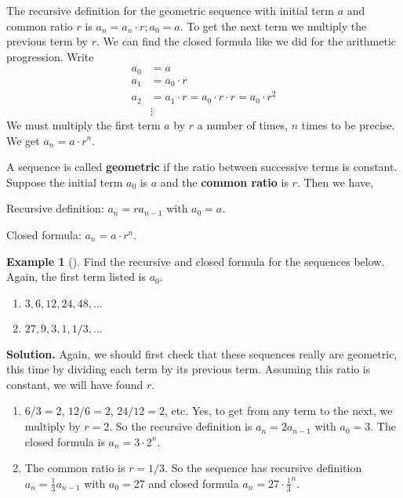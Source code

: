 \documentclass[12pt,]{book}
\newcommand{\terminology}[1]{\textbf{#1}}
\theoremstyle{plain}
\theoremstyle{definition}
\theoremstyle{definition}
\newtheorem{example}[theorem]{Example}
\theoremstyle{definition}
\numberwithin{equation}{chapter}
\newcommand{\amp}{&}
\begin{document}
\par
\hypertarget{p-114}{}%
The recursive definition for the geometric sequence with initial term \(a\) and common ratio \(r\) is \(a_n = a_{n}\cdot r; a_0 = a\). To get the next term we multiply the previous term by \(r\). We can find the closed formula like we did for the arithmetic progression. Write%
\begin{align*}
a_0 \amp = a\\
a_1 \amp = a_0\cdot r\\
a_2 \amp = a_1 \cdot r = a_0\cdot r\cdot r = a_0\cdot r^2\\
\amp \vdots 
\end{align*}
We must multiply the first term \(a\) by \(r\) a number of times, \(n\) times to be precise. We get \(a_n = a\cdot r^{n}\).%
\begin{assemblage}\label{assemblage-4}
\hypertarget{p-115}{}%
A sequence is called \terminology{geometric} if the ratio between successive terms is constant. Suppose the initial term \(a_0\) is \(a\) and the \terminology{common ratio} is \(r\). Then we have,%
\par
\hypertarget{p-116}{}%
Recursive definition: \(a_n = ra_{n-1}\) with \(a_0 = a\).%
\par
\hypertarget{p-117}{}%
Closed formula: \(a_n = a\cdot r^{n}\).%
\end{assemblage}
\begin{example}[]\label{example-6}
\hypertarget{p-118}{}%
Find the recursive and closed formula for the sequences below. Again, the first term listed is \(a_0\). \leavevmode%
\begin{enumerate}
\item\hypertarget{li-78}{}\(3, 6, 12, 24, 48, \ldots\)%
\item\hypertarget{li-79}{}\(27, 9, 3, 1, 1/3, \ldots\)%
\end{enumerate}
%
\par\smallskip%
\noindent\textbf{Solution.}\hypertarget{solution-8}{}\quad%
\hypertarget{p-119}{}%
Again, we should first check that these sequences really are geometric, this time by dividing each term by its previous term.  Assuming this ratio is constant, we will have found \(r\). \leavevmode%
\begin{enumerate}
\item\hypertarget{li-80}{}\(6/3 = 2\), \(12/6 = 2\), \(24/12 = 2\), etc. Yes, to get from any term to the next, we multiply by \(r = 2\). So the recursive definition is \(a_n = 2a_{n-1}\) with \(a_0 = 3\). The closed formula is \(a_n = 3\cdot 2^{n}\).%
\item\hypertarget{li-81}{}\hypertarget{p-120}{}%
The common ratio is \(r = 1/3\). So the sequence has recursive definition \(a_n = \frac{1}{3}a_{n-1}\) with \(a_0 = 27\) and closed formula \(a_n = 27\cdot \frac{1}{3}^{n}\).%
\end{enumerate}
%
\end{example}
\end{document}
